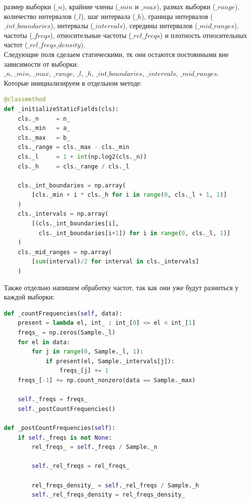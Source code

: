 \documentclass[a4paper, 14pt]{extarticle}
\begin{document}
размер выборки ($\_n$), крайние члены ($\_min$ и $\_max$), размах выборки ($\_range$),
количество интервалов ($\_l$), шаг интервала ($\_h$), границы интервалов ($\_int\_boundaries$),
интервалы ($\_intervals$), середины интервалов ($\_mid\_ranges$), частоты ($\_freqs$),
относительные частоты ($\_rel\_freqs$) и плотность относительных частот ($\_rel\_freqs\_density$).\\

Следующие поля сделаем статическими, тк они остаются постоянными вне зависимости от выборки:\\
$\_n$, $\_min$, $\_max$, $\_range$, $\_l$, $\_h$, $\_int\_boundaries$, $\_intervals$, $\_mid\_ranges$.\\

Которые инициализируем в отдельном методе:
\begin{center}
  \begin{lstlisting}[language=Python]
@classmethod
def _initializeStaticFields(cls):
    cls._n     = n_
    cls._min   = a_
    cls._max   = b_
    cls._range = cls._max - cls._min
    cls._l     = 1 + int(np.log2(cls._n))
    cls._h     = cls._range / cls._l
    
    cls._int_boundaries = np.array(
        [cls._min + i * cls._h for i in range(0, cls._l + 1, 1)]
    )
    cls._intervals = np.array(
        [(cls._int_boundaries[i], 
          cls._int_boundaries[i+1]) for i in range(0, cls._l, 1)]
    )
    cls._mid_ranges = np.array(
        [sum(interval)/2 for interval in cls._intervals]
    )
  \end{lstlisting}
\end{center}

Также отдельно напишем обработку частот, так как они уже будут разниться у каждой выборки:
\begin{center}
  \begin{lstlisting}[language=Python]
def _countFrequencies(self, data):
    present = lambda el, int_ : int_[0] <= el < int_[1]
    freqs_ = np.zeros(Sample._l)
    for el in data:
        for j in range(0, Sample._l, 1):
            if present(el, Sample._intervals[j]):
                freqs_[j] += 1 
    freqs_[-1] += np.count_nonzero(data == Sample._max)

    self._freqs = freqs_
    self._postCountFrequencies()

def _postCountFrequencies(self):
    if self._freqs is not None:
        rel_freqs_ = self._freqs / Sample._n

        self._rel_freqs = rel_freqs_

        rel_freqs_density_ = self._rel_freqs / Sample._h
        self._rel_freqs_density = rel_freqs_density_
  \end{lstlisting}
\end{center}
\end{document}
